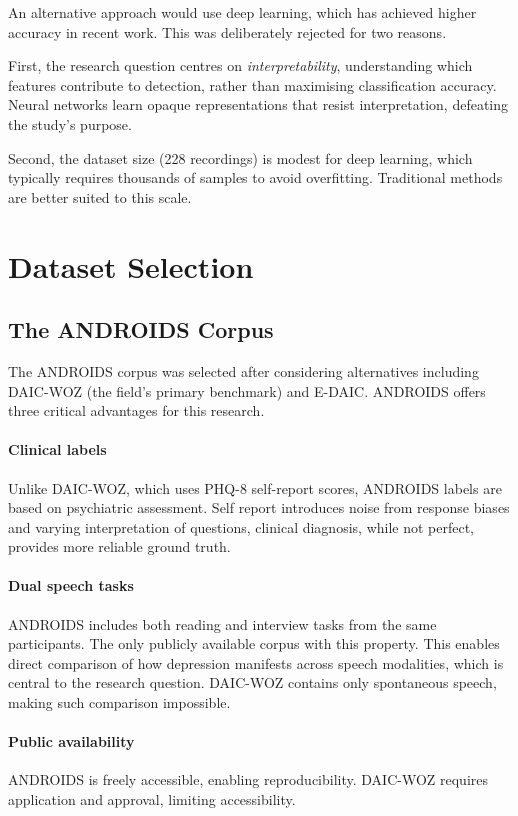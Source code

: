 An alternative approach would use deep learning, which has achieved higher accuracy in recent work. This was deliberately rejected for two reasons.

First, the research question centres on \textit{interpretability}, understanding which features contribute to detection, rather than maximising classification accuracy. Neural networks learn opaque representations that resist interpretation, defeating the study's purpose.

Second, the dataset size (228 recordings) is modest for deep learning, which typically requires thousands of samples to avoid overfitting. Traditional methods are better suited to this scale.

\section{Dataset Selection}

\subsection{The ANDROIDS Corpus}

The ANDROIDS corpus was selected after considering alternatives including DAIC-WOZ (the field's primary benchmark) and E-DAIC. ANDROIDS offers three critical advantages for this research.

\paragraph{Clinical labels} Unlike DAIC-WOZ, which uses PHQ-8 self-report scores, ANDROIDS labels are based on psychiatric assessment. Self report introduces noise from response biases and varying interpretation of questions, clinical diagnosis, while not perfect, provides more reliable ground truth.

\paragraph{Dual speech tasks} ANDROIDS includes both reading and interview tasks from the same participants. The only publicly available corpus with this property. This enables direct comparison of how depression manifests across speech modalities, which is central to the research question. DAIC-WOZ contains only spontaneous speech, making such comparison impossible.

\paragraph{Public availability} ANDROIDS is freely accessible, enabling reproducibility. DAIC-WOZ requires application and approval, limiting accessibility.

